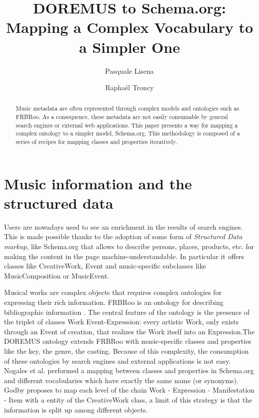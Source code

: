 \documentclass{llncs}
\begin{document}
\title{DOREMUS to Schema.org: Mapping a Complex Vocabulary to a Simpler One}

\author{Pasquale Lisena \and Rapha\"el Troncy}

\maketitle


\begin{abstract}
Music metadata are often represented through complex models and ontologies such as FRBRoo. As a consequence, these metadata are not easily consumable by general search engines or external web applications. This paper presents a way for mapping a complex ontology to a simpler model, Schema.org. This methodology is composed of a series of recipes for mapping classes and properties iteratively.

\end{abstract}


\section{Music information and the structured data}
\label{sec:introduction}

Users are nowadays used to see an enrichment in the results of search engines. This is made possible thanks to the adoption of some form of \textit{Structured Data markup}, like Schema.org \cite{guha2015schema} that allows to describe persons, places, products, etc. for making the content in the page machine-understandable. In particular it offers classes like CreativeWork, Event and music-specific subclasses like MusicComposition or MusicEvent.

Musical works are complex objects that requires complex ontologies for expressing their rich information. FRBRoo is an ontology for describing bibliographic information \cite{doerr2008frbroo}. The central feature of the ontology is the presence of the triplet of classes Work Event-Expression: every artistic Work, only exists through an Event of creation, that realizes the Work itself into an Expression.The DOREMUS ontology \cite{achichidoremus} extends FRBRoo with music-specific classes and properties like the key, the genre, the casting. Because of this complexity, the consumption of these ontologies by search engines and external applications is not easy.
Nogales et al. \cite{nogales2016linking} performed a mapping between classes and properties in Schema.org and different vocabularies which have exactly the same name (or synonyms).
Godby \cite{godby2013relationship} proposes to map each level of the chain Work - Expression - Manifestation - Item with a entity of the CreativeWork class, a limit of this strategy is that the information is split up among different objects.
\end{document}

